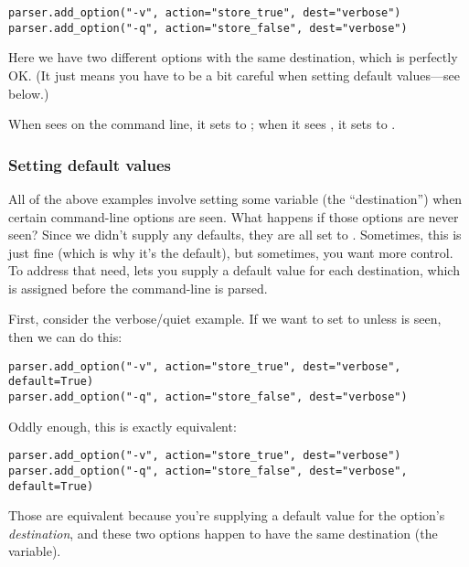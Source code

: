 \begin{verbatim}
parser.add_option("-v", action="store_true", dest="verbose")
parser.add_option("-q", action="store_false", dest="verbose")
\end{verbatim}

Here we have two different options with the same destination, which is
perfectly OK.  (It just means you have to be a bit careful when setting
default values---see below.)

When  sees  on the command line, it sets
 to ; when it sees , it
sets  to .

\subsubsection{Setting default values\label{optparse-setting-default-values}}

All of the above examples involve setting some variable (the
``destination'') when certain command-line options are seen.  What
happens if those options are never seen?  Since we didn't supply any
defaults, they are all set to .  Sometimes, this is just fine (which
is why it's the default), but sometimes, you want more control.  To
address that need,  lets you supply a default value for
each destination, which is assigned before the command-line is parsed.

First, consider the verbose/quiet example.  If we want
 to set  to  unless
 is seen, then we can do this:

\begin{verbatim}
parser.add_option("-v", action="store_true", dest="verbose", default=True)
parser.add_option("-q", action="store_false", dest="verbose")
\end{verbatim}

Oddly enough, this is exactly equivalent:

\begin{verbatim}
parser.add_option("-v", action="store_true", dest="verbose")
parser.add_option("-q", action="store_false", dest="verbose", default=True)
\end{verbatim}

Those are equivalent because you're supplying a default value for the
option's \emph{destination}, and these two options happen to have the same
destination (the  variable).

